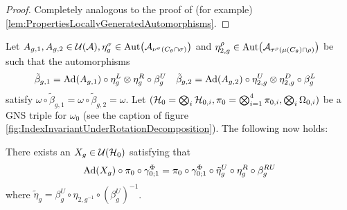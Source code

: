 \documentclass[11pt,a4paper,twoside]{article}
\numberwithin{equation}{section}
\begin{document}
	\begin{proof}
		Completely analogous to the proof of (for example) \ref{lem:PropertiesLocallyGeneratedAutomorphisms}.
	\end{proof}
	Let $A_{g,1},A_{g,2}\in\UU(\AA),\eta^\sigma_g\in\Aut{\AA_{\nu^{\sigma}(C_\theta\cap\sigma)}}$ and $\eta^\rho_{2,g}\in\Aut{\AA_{\tau^{\rho}(\mu(C_\theta)\cap\rho)}}$ be such that the automorphisms
	\begin{align}
		\tilde{\beta}_{g,1}&=\Ad{A_{g,1}}\circ\eta_g^L\otimes\eta_g^R\circ\beta_g^U&\tilde{\beta}_{g,2}&=\Ad{A_{g,2}}\circ\eta_{2,g}^U\otimes\eta_{2,g}^D\circ\beta_g^L
	\end{align}
	satisfy $\omega\circ\tilde{\beta}_{g,1}=\omega\circ\tilde{\beta}_{g,2}=\omega$. Let $(\mathcal H_0=\bigotimes_i\mathcal H_{0,i},\pi_0=\bigotimes_{i=1}^4\pi_{0,i},\bigotimes_i\Omega_{0,i})$ be a GNS triple for $\omega_0$ (see the caption of figure \ref{fig:IndexInvariantUnderRotationDecomposition}). The following now holds:
	\begin{lemma}\label{lem:DefinitionX_gLemma}
		There exists an $X_g\in\mathcal U(\mathcal H_0)$ satisfying that
		\begin{equation}\label{eq:DefinitionX_gLemma}
			\Ad{X_g}\circ\pi_0\circ\gamma^\Phi_{0;1}=\pi_0\circ\gamma^\Phi_{0;1}\circ\tilde{\eta}^U_g\circ\eta^R_g\circ\beta_g^{RU}
		\end{equation}
		where $\tilde{\eta}_g=\beta_g^U\circ\eta_{2,g^{-1}}\circ(\beta_g^U)^{-1}$.
	\end{lemma}
\end{document}
